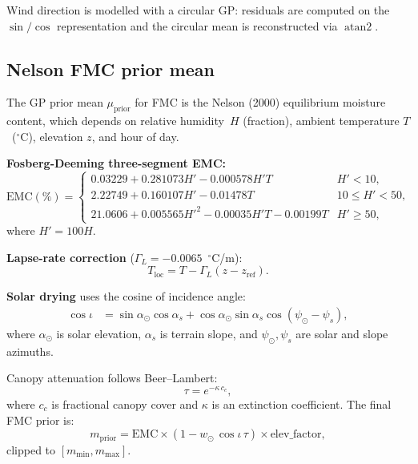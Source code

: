 \documentclass[11pt,twocolumn]{article}
\begin{document}
Wind direction is modelled with a circular GP: residuals are computed
on the $\sin/\cos$ representation and the circular mean is
reconstructed via $\operatorname{atan2}$.

\subsection{Nelson FMC prior mean}

The GP prior mean $\mu_{\mathrm{prior}}$ for FMC is the Nelson (2000)
equilibrium moisture content, which depends on relative humidity~$H$
(fraction), ambient temperature $T$~($^\circ$C), elevation $z$, and
hour of day.

\textbf{Fosberg-Deeming three-segment EMC:}
\begin{equation}
  \mathrm{EMC}(\%) =
  \begin{cases}
    0.03229 + 0.281073H' - 0.000578H'T &H'\!<10,\\
    2.22749 + 0.160107H' - 0.01478T    &10\le H'\!<50,\\
    21.0606 + 0.005565H'^2 - 0.00035H'T - 0.00199T &H'\!\ge50,
  \end{cases}\label{eq:emc}
\end{equation}
where $H'=100H$.

\textbf{Lapse-rate correction} ($\Gamma_L=-0.0065$~$^\circ$C/m):
\begin{equation}
  T_{\mathrm{loc}} = T - \Gamma_L(z-z_{\mathrm{ref}}).\label{eq:lapse}
\end{equation}

\textbf{Solar drying} uses the cosine of incidence angle:
\begin{align}
  \cos\iota &= \sin\!\alpha_\odot\cos\alpha_s
               + \cos\!\alpha_\odot\sin\alpha_s\cos(\psi_\odot-\psi_s),
  \label{eq:cosinc}
\end{align}
where $\alpha_\odot$ is solar elevation, $\alpha_s$ is terrain slope,
and $\psi_\odot,\psi_s$ are solar and slope azimuths.

Canopy attenuation follows Beer--Lambert:
\begin{equation}
  \tau = e^{-\kappa\,c_c},\label{eq:beerlambert}
\end{equation}
where $c_c$ is fractional canopy cover and $\kappa$ is an extinction
coefficient.  The final FMC prior is:
\begin{equation}
  m_{\mathrm{prior}} = \mathrm{EMC}\times
    (1 - w_\odot\,\cos\iota\,\tau)\times\mathrm{elev\_factor},\label{eq:fmcprior}
\end{equation}
clipped to $[m_{\min},m_{\max}]$.
\end{document}
